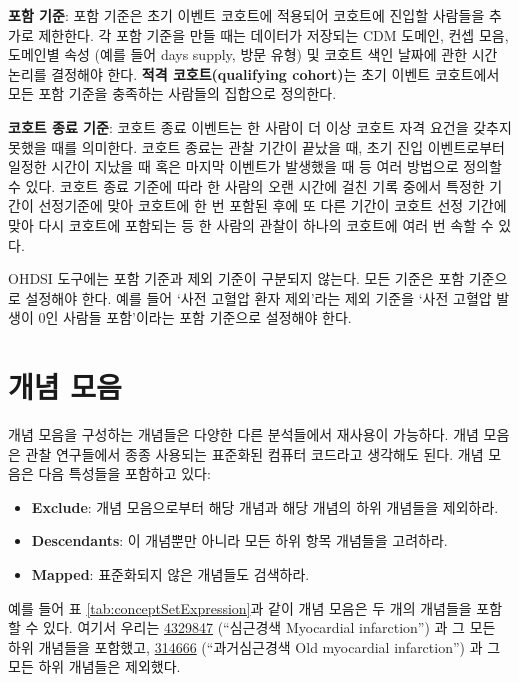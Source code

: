 \documentclass[11pt]{book}
\providecommand{\tightlist}{%
  \setlength{\itemsep}{0pt}\setlength{\parskip}{0pt}}
\theoremstyle{definition}
\theoremstyle{definition}
\theoremstyle{definition}
\theoremstyle{remark}
\let\BeginKnitrBlock\begin \let\EndKnitrBlock\end
\begin{document}
\textbf{포함 기준}: 포함 기준은 초기 이벤트 코호트에 적용되어 코호트에
진입할 사람들을 추가로 제한한다. 각 포함 기준을 만들 때는 데이터가
저장되는 CDM 도메인, 컨셉 모음, 도메인별 속성 (예를 들어 days supply,
방문 유형) 및 코호트 색인 날짜에 관한 시간 논리를 결정해야 한다.
\textbf{적격 코호트(qualifying cohort)}는 초기 이벤트 코호트에서 모든
포함 기준을 충족하는 사람들의 집합으로 정의한다.

\textbf{코호트 종료 기준}: 코호트 종료 이벤트는 한 사람이 더 이상 코호트
자격 요건을 갖추지 못했을 때를 의미한다. 코호트 종료는 관찰 기간이
끝났을 때, 초기 진입 이벤트로부터 일정한 시간이 지났을 때 혹은 마지막
이벤트가 발생했을 때 등 여러 방법으로 정의할 수 있다. 코호트 종료 기준에
따라 한 사람의 오랜 시간에 걸친 기록 중에서 특정한 기간이 선정기준에
맞아 코호트에 한 번 포함된 후에 또 다른 기간이 코호트 선정 기간에 맞아
다시 코호트에 포함되는 등 한 사람의 관찰이 하나의 코호트에 여러 번 속할
수 있다.

\BeginKnitrBlock{rmdimportant}
OHDSI 도구에는 포함 기준과 제외 기준이 구분되지 않는다. 모든 기준은 포함
기준으로 설정해야 한다. 예를 들어 `사전 고혈압 환자 제외'라는 제외
기준을 `사전 고혈압 발생이 0인 사람들 포함'이라는 포함 기준으로 설정해야
한다.
\EndKnitrBlock{rmdimportant}

\section{개념 모음}\label{conceptSets}


개념 모음을 구성하는 개념들은 다양한 다른 분석들에서 재사용이 가능하다.
개념 모음은 관찰 연구들에서 종종 사용되는 표준화된 컴퓨터 코드라고
생각해도 된다. 개념 모음은 다음 특성들을 포함하고 있다:

\begin{itemize}
\tightlist
\item
  \textbf{Exclude}: 개념 모음으로부터 해당 개념과 해당 개념의 하위
  개념들을 제외하라.
\item
  \textbf{Descendants}: 이 개념뿐만 아니라 모든 하위 항목 개념들을
  고려하라.
\item
  \textbf{Mapped}: 표준화되지 않은 개념들도 검색하라.
\end{itemize}

예를 들어 표 \ref{tab:conceptSetExpression}과 같이 개념 모음은 두 개의
개념들을 포함할 수 있다. 여기서 우리는
\href{http://athena.ohdsi.org/search-terms/terms/4329847}{4329847}
(``심근경색 Myocardial infarction'') 과 그 모든 하위 개념들을 포함했고,
\href{http://athena.ohdsi.org/search-terms/terms/314666}{314666}
(``과거심근경색 Old myocardial infarction'') 과 그 모든 하위 개념들은
제외했다.
\end{document}
